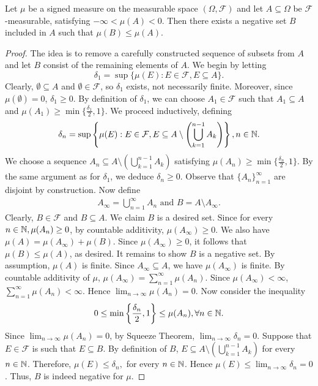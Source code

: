 \begin{lemma}
\label{lemma:negative-set}
Let $\mu$ be a signed measure on the measurable space $(\Omega, \mathcal{F})$ and let $A \subseteq \Omega$ be $\mathcal{F}$-measurable, satisfying $-\infty < \mu(A) < 0$. Then there exists a negative set $B$ included in $A$ such that $\mu(B) \leq \mu(A)$.
\begin{proof}
The idea is to remove a carefully constructed sequence of subsets from $A$ and let $B$ consist of the remaining elements of $A$. We begin by letting
\begin{equation*}
    \delta_1 = \sup \{ \mu(E) : E \in \mathcal{F}, E \subseteq A \}.
\end{equation*}
Clearly, $\emptyset \subseteq A$ and $\emptyset \in \mathcal{F}$, so $\delta_1$ exists, not necessarily finite. Moreover, since $\mu(\emptyset) = 0$, $\delta_1 \geq 0$. By definition of $\delta_1$, we can choose $A_1 \in \mathcal{F}$ such that $A_1 \subseteq A$ and $\mu(A_1) \geq \min \{ \frac{\delta_1}{2}, 1 \}$. We proceed inductively, defining
\begin{align*}
    \delta_n = \sup \left \{ \mu(E) : E \in \mathcal{F}, E \subseteq A \setminus \left ( \bigcup_{k = 1}^{n - 1} A_k \right ) \right \}, n \in {\mathbb N}.
\end{align*}
We choose a sequence $A_n \subseteq A \setminus \left ( \bigcup_{k = 1}^{n - 1} A_k \right )$ satisfying $\mu (A_n) \geq \min \{ \frac{\delta_n}{2}, 1 \}$. By the same argument as for $\delta_{1}$, we deduce $\delta_n \geq 0$. Observe that $\{ A_n \}_{n=1}^{\infty}$ are disjoint by construction. Now define
\begin{align*}
    A_\infty = \bigcup_{n = 1} ^ \infty A_n \text{ and } B = A \setminus A_\infty.
\end{align*}
Clearly, $B \in \mathcal{F}$ and $B \subseteq A$. We claim $B$ is a desired set. Since for every $n \in {\mathbb N}, \mu (A_n) \geq 0$, by countable additivity, $\mu(A_\infty) \geq 0$. We also have $\mu(A) = \mu(A_\infty) + \mu(B)$. Since $\mu(A_\infty) \geq 0$, it follows that $\mu(B) \leq \mu(A)$, as desired. It remains to show $B$ is a negative set.
By assumption, $\mu(A)$ is finite. Since $A_\infty \subseteq A$, we have $\mu(A_\infty)$ is finite. By countable additivity of $\mu$, $\mu (A_\infty) = \sum_{n = 1}^{\infty} \mu (A_n)$. Since $\mu(A_\infty) < \infty$, $\sum_{n = 1}^{\infty} \mu (A_n) < \infty$. Hence $\lim_{n \to \infty} \mu(A_n) = 0$. Now consider the inequality
\begin{align*}
    0 \leq \min \left \{ \frac{\delta_n}{2}, 1 \right \} \leq \mu (A_n), \forall n \in {\mathbb N}.
\end{align*}
Since $\lim_{n \to \infty} \mu(A_n) = 0$, by Squeeze Theorem, $\lim_{n \to \infty} \delta_n = 0$. Suppose that $E \in \mathcal{F}$ is such that $E \subseteq B$. By definition of $B$, $E \subseteq A \setminus \left ( \bigcup_{k = 1}^{n - 1} A_k \right )$ for every $n \in {\mathbb N}$. Therefore, $\mu (E) \leq \delta_n,$ for every $n \in {\mathbb N}$. Hence $\mu(E) \leq \lim_{n \to \infty} \delta_n = 0 $. Thus, $B$ is indeed negative for $\mu$.
\end{proof}
\end{lemma}
